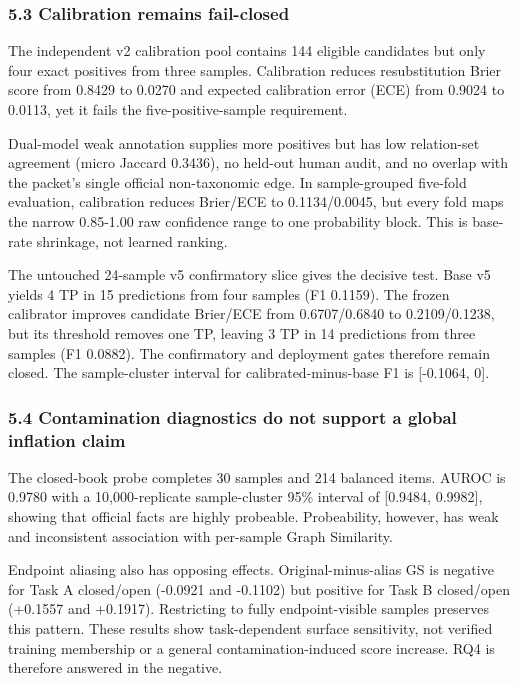 \documentclass[
]{article}
\begin{document}
\subsubsection{5.3 Calibration remains
fail-closed}\label{calibration-remains-fail-closed}

The independent v2 calibration pool contains 144 eligible candidates but
only four exact positives from three samples. Calibration reduces
resubstitution Brier score from 0.8429 to 0.0270 and expected
calibration error (ECE) from 0.9024 to 0.0113, yet it fails the
five-positive-sample requirement.

Dual-model weak annotation supplies more positives but has low
relation-set agreement (micro Jaccard 0.3436), no held-out human audit,
and no overlap with the packet's single official non-taxonomic edge. In
sample-grouped five-fold evaluation, calibration reduces Brier/ECE to
0.1134/0.0045, but every fold maps the narrow 0.85-1.00 raw confidence
range to one probability block. This is base-rate shrinkage, not learned
ranking.

The untouched 24-sample v5 confirmatory slice gives the decisive test.
Base v5 yields 4 TP in 15 predictions from four samples (F1 0.1159). The
frozen calibrator improves candidate Brier/ECE from 0.6707/0.6840 to
0.2109/0.1238, but its threshold removes one TP, leaving 3 TP in 14
predictions from three samples (F1 0.0882). The confirmatory and
deployment gates therefore remain closed. The sample-cluster interval
for calibrated-minus-base F1 is {[}-0.1064, 0{]}.

\subsubsection{5.4 Contamination diagnostics do not support a global
inflation
claim}\label{contamination-diagnostics-do-not-support-a-global-inflation-claim}

The closed-book probe completes 30 samples and 214 balanced items. AUROC
is 0.9780 with a 10,000-replicate sample-cluster 95\% interval of
{[}0.9484, 0.9982{]}, showing that official facts are highly probeable.
Probeability, however, has weak and inconsistent association with
per-sample Graph Similarity.

Endpoint aliasing also has opposing effects. Original-minus-alias GS is
negative for Task A closed/open (-0.0921 and -0.1102) but positive for
Task B closed/open (+0.1557 and +0.1917). Restricting to fully
endpoint-visible samples preserves this pattern. These results show
task-dependent surface sensitivity, not verified training membership or
a general contamination-induced score increase. RQ4 is therefore
answered in the negative.
\end{document}
